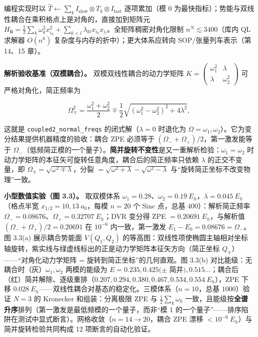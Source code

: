 \documentclass[
]{ctexbook}
\begin{document}
编程实现时以
\(\hat{T}\leftarrow\sum_k I_{\mathrm{slow}}\otimes T_k\otimes I_{\mathrm{fast}}\)
逐项累加（模 0
为最快指标）；势能与双线性耦合在乘积格点上是对角的，直接加到矩阵元
\(H_{\mathbf{i}\mathbf{i}}=\frac12\sum_k\omega_k^{2}x_{i_k}^{2}+\sum_{k<l}\lambda_{kl}x_{i_k}x_{i_l}\)。全矩阵稠密对角化限制
\(n^{N}\lesssim3400\)（库内 QL 求解器 \(O(n^{6})\)
复杂度与内存的折中）；更大体系应转向 SOP/张量列车表示（第 14、15 章）。

\textbf{解析验收基准（双模耦合）。} 双模双线性耦合的动力学矩阵
\(K=\begin{pmatrix}\omega_1^{2}&\lambda\\ \lambda&\omega_2^{2}\end{pmatrix}\)
可严格对角化，简正频率为

\[\Omega_{\mp}^{2}=\frac{\omega_1^{2}+\omega_2^{2}}{2}\mp\frac{1}{2}\sqrt{(\omega_1^{2}-\omega_2^{2})^{2}+4\lambda^{2}},\]

这就是 \texttt{coupled2\_normal\_freqs} 的闭式解（\(\lambda=0\) 时退化为
\(\Omega=\omega_1,\omega_2\)）。它为变分结果提供机器精度的验收：耦合 ZPE
必须等于 \((\Omega_-+\Omega_+)/2\)，第一激发能等于
\(\Omega_-\)（低频简正模的一个量子）。\textbf{简并旋转不变性}是又一重解析检验：\(\omega_1=\omega_2\)
时动力学矩阵的本征矢可旋转任意角度，耦合后的简正频率只依赖 \(\lambda\)
的正交不变量，即 \(\Omega_{\mp}=\sqrt{\omega^{2}\mp\lambda}\)，分裂
\(=\sqrt{\omega^{2}+\lambda}-\sqrt{\omega^{2}-\lambda}\)
与``旋转简正坐标不改变物理''一致。

\textbf{小型数值实验（图 3.3）。} 取双模体系
\(\omega_1=0.28\)、\(\omega_2=0.19\ E_h\)，\(\lambda=0.045\ E_h\)（格点半宽
\(x_{1/2}=10,13\ a_0\)，每模 \(n=20\) 个 Sinc 点，总基
\(400\)）：解析简正频率
\(\Omega_-=0.08676\)、\(\Omega_+=0.32707\ E_h\)；DVR 变分得 ZPE
\(=0.20691\ E_h\)，与解析值 \((\Omega_-+\Omega_+)/2=0.20691\) 在
\(10^{-6}\) 内一致，第一激发 \(E_1-E_0=0.08676=\Omega_-\)。图 3.3(a)
展示耦合势能面 \(V(Q_1,Q_2)\)
的等高图：双线性项使椭圆主轴相对坐标轴旋转，紫实线与绿虚线标出的正是动力学矩阵本征矢方向（简正坐标
\(Q_\mp\)）------``对角化动力学矩阵 = 旋转到简正坐标''的几何直观。图
3.3(b) 对比能级：无耦合时（灰）\(\omega_1,\omega_2\) 两模的能级为
\(E=0.235,0.425(\pm\)
简并\(),0.515\ldots\)；耦合后（红）简并解除、逐级重排（\(0.207,0.294,0.380,0.467,0.534,0.554\ E_h\)），ZPE
下移
\(0.028\ E_h\)------双线性耦合对基态的稳定化。三模体系（\(n=10\)，总基
\(1000\)）验证 \(N=3\) 的 Kronecker 和组装：分离极限 ZPE 与
\(\frac12\sum_k\omega_k\)
一致，且能级按\textbf{全谱升序}排列（第一激发是最低频模的一个量子，而非``模
1
的一个量子''------排序陷阱在测试中显式断言）。网格收敛（\(n=14\to20\)，耦合
ZPE 漂移 \(<10^{-6}\ E_h\)）与简并旋转检验共同构成 12
项断言的自动化验证。
\end{document}
